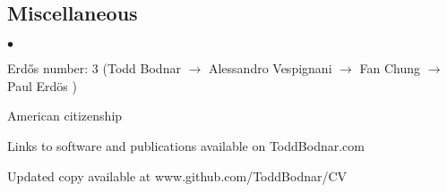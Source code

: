 \documentclass[margin,line]{res}
\newenvironment{list2}{
  \begin{list}{$\bullet$}{%
      \setlength{\itemsep}{0in}
      \setlength{\parsep}{0in} \setlength{\parskip}{0in}
      \setlength{\topsep}{0in} \setlength{\partopsep}{0in} 
      \setlength{\leftmargin}{10pt}}}{\end{list}}
\begin{document}
\begin{resume}
\section{\sc Miscellaneous}
\begin{list2}
\item Erd\H{o}s number: 3 (Todd Bodnar \(\rightarrow\) Alessandro Vespignani \(\rightarrow\) Fan Chung \(\rightarrow\) Paul Erd\"os )
\item American citizenship
\item Links to software and publications available on ToddBodnar.com
\item Updated copy available at www.github.com/ToddBodnar/CV
\end{list2}


\end{resume}
\end{document}
